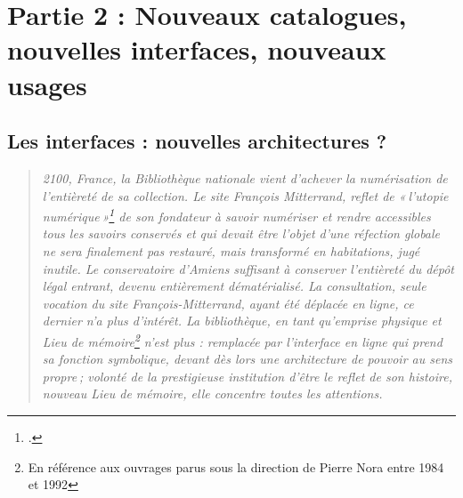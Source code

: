 	
	

\part{Partie 2 : Nouveaux catalogues, nouvelles interfaces, nouveaux usages}




\chapter{Les interfaces : nouvelles architectures ?}
\begin{quote}
	\textit{2100, France, la Bibliothèque nationale vient d’achever la numérisation de l’entièreté de sa collection. Le site François Mitterrand, reflet de « l’utopie numérique »\footcite[p. 20]{bermes2024} de son fondateur à savoir numériser et rendre accessibles tous les savoirs conservés et qui devait être l’objet d’une réfection globale ne sera finalement pas restauré, mais transformé en habitations, jugé inutile. Le conservatoire d’Amiens suffisant à conserver l’entièreté du dépôt légal entrant, devenu entièrement dématérialisé. La consultation, seule vocation du site François-Mitterrand, ayant été déplacée en ligne, ce dernier n'a plus d'intérêt. La bibliothèque, en tant qu’emprise physique et Lieu de mémoire\footnote{En référence aux ouvrages parus sous la direction de Pierre Nora entre 1984 et 1992} n’est plus : remplacée par l’interface en ligne qui prend sa fonction symbolique, devant dès lors une architecture de pouvoir au sens propre ; volonté de la prestigieuse institution d’être le reflet de son histoire, nouveau Lieu de mémoire, elle concentre toutes les attentions.}
\end{quote}


